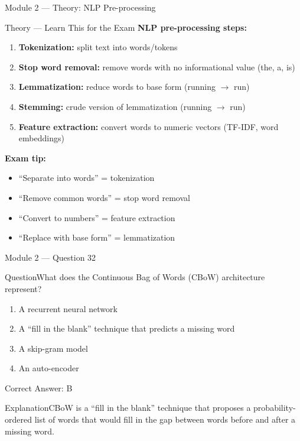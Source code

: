 \documentclass[aspectratio=169,10pt]{beamer}
\newcommand{\question}[1]{\begin{block}{Question}#1\end{block}}
\newcommand{\options}[4]{%
	\begin{enumerate}[label=\Alph*.,leftmargin=*]
		\item #1
		\item #2
		\item #3
		\item #4
	\end{enumerate}
}
\newcommand{\answerbox}[1]{\begin{exampleblock}{Correct Answer: #1}\end{exampleblock}}
\newcommand{\explain}[1]{\begin{block}{Explanation}#1\end{block}}
\newcommand{\theory}[1]{%
	\begin{block}{Theory --- Learn This for the Exam}
		\small #1
	\end{block}
}
\begin{document}
	\begin{frame}{Module 2 --- Theory: NLP Pre-processing}
		\theory{
			\textbf{NLP pre-processing steps:}
			\begin{enumerate}
				\item \textbf{Tokenization:} split text into words/tokens
				\item \textbf{Stop word removal:} remove words with no informational value (the, a, is)
				\item \textbf{Lemmatization:} reduce words to base form (running $\rightarrow$ run)
				\item \textbf{Stemming:} crude version of lemmatization (running $\rightarrow$ run)
				\item \textbf{Feature extraction:} convert words to numeric vectors (TF-IDF, word embeddings)
			\end{enumerate}
			\textbf{Exam tip:}
			\begin{itemize}
				\item ``Separate into words'' = tokenization
				\item ``Remove common words'' = stop word removal
				\item ``Convert to numbers'' = feature extraction
				\item ``Replace with base form'' = lemmatization
			\end{itemize}
		}
	\end{frame}
	
	\begin{frame}{Module 2 --- Question 32}
		\question{What does the Continuous Bag of Words (CBoW) architecture represent?}
		\options{A recurrent neural network}{A ``fill in the blank'' technique that predicts a missing word}{A skip-gram model}{An auto-encoder}
		\answerbox{B}
		\explain{CBoW is a ``fill in the blank'' technique that proposes a probability-ordered list of words that would fill in the gap between words before and after a missing word.}
	\end{frame}
	
\end{document}
